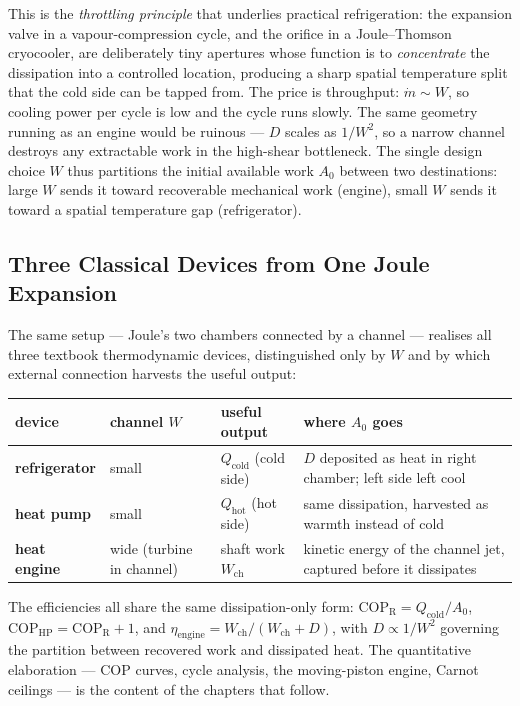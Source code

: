 This is the \emph{throttling principle} that underlies practical refrigeration:
the expansion valve in a vapour-compression cycle, and the orifice in a
Joule--Thomson cryocooler, are deliberately tiny apertures whose function is to
\emph{concentrate} the dissipation into a controlled location, producing a sharp
spatial temperature split that the cold side can be tapped from. The price is
throughput: $\dot m\sim W$, so cooling power per cycle is low and the cycle
runs slowly. The same geometry running as an engine would be ruinous --- $D$
scales as $1/W^2$, so a narrow channel destroys any extractable work in the
high-shear bottleneck. The single design choice $W$ thus partitions the
initial available work $A_0$ between two destinations: large $W$ sends it
toward recoverable mechanical work (engine), small $W$ sends it toward a
spatial temperature gap (refrigerator).

\subsection{Three Classical Devices from One Joule Expansion}

The same setup --- Joule's two chambers connected by a channel --- realises all
three textbook thermodynamic devices, distinguished only by $W$ and by which
external connection harvests the useful output:
\begin{center}
\small
\begin{tabular}{@{}l p{2.2cm} p{2.6cm} p{6.0cm}@{}}
\hline
device & channel $W$ & useful output & where $A_0$ goes \\
\hline
\textbf{refrigerator} & small & $Q_{\mathrm{cold}}$ (cold side) &
$D$ deposited as heat in right chamber; left side left cool \\
\textbf{heat pump}    & small & $Q_{\mathrm{hot}}$ (hot side)  &
same dissipation, harvested as warmth instead of cold \\
\textbf{heat engine}  & wide (turbine in channel) & shaft work $W_{\mathrm{ch}}$ &
kinetic energy of the channel jet, captured before it dissipates \\
\hline
\end{tabular}
\end{center}
The efficiencies all share the same dissipation-only form:
$\mathrm{COP}_{\mathrm R}=Q_{\mathrm{cold}}/A_0$,
$\mathrm{COP}_{\mathrm{HP}}=\mathrm{COP}_{\mathrm R}+1$, and
$\eta_{\mathrm{engine}}=W_{\mathrm{ch}}/(W_{\mathrm{ch}}+D)$, with $D \propto 1/W^2$
governing the partition between recovered work and dissipated heat. The
quantitative elaboration --- COP curves, cycle analysis, the moving-piston
engine, Carnot ceilings --- is the content of the chapters that follow.

